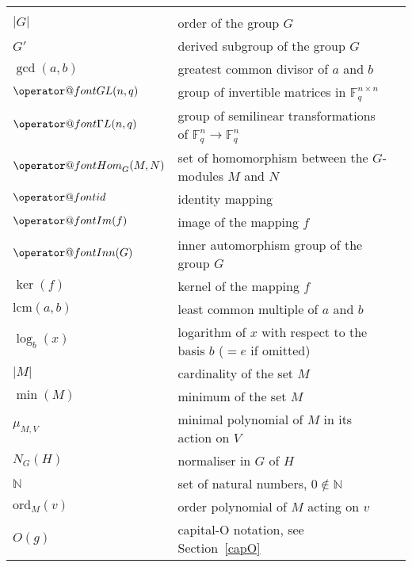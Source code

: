 \documentclass[openany,11pt,british]{book}
\makeatletter
\newcommand{\maop}[1]{%
\ensuremath{\mathop{\operator@font #1}\nolimits}}
\newcommand{\Hom}{\maop{Hom}}
\newcommand{\id}{\maop{id}}
\newcommand{\Ima}{\maop{Im}}
\newcommand{\GL}{\maop{GL}}
\newcommand{\GGL}{\maop{\Gamma L}}
\newcommand{\ord}{\mathrm{ord}}
\newcommand{\lcm}{\mathrm{lcm}}
\newcommand{\Inn}{\maop{Inn}}
\newcommand{\F}{\ensuremath{\mathbb{F}}}
\newcommand{\N}{\ensuremath{\mathbb{N}}}
\theoremstyle{changebreak}
\makeatother
\begin{document}
\begin{longtable}{|lll|}
                        & \\
$|G|$                   & order of the group $G$
                        & \\
$G'$                    & derived subgroup of the group $G$
                        & \\
$\gcd(a,b)$             & greatest common divisor of $a$ and $b$
                        & \\
$\GL(n,q)$              & group of invertible matrices in $\F_q^{n \times n}$
                        & \\
$\GGL(n,q)$             & group of semilinear transformations of 
                          $\F_q^n \to \F_q^n$
                        & \\
$\Hom_G(M,N)$           & set of homomorphism between the $G$-modules $M$
                          and $N$
                        & \\
$\id$                   & identity mapping
                        & \\
$\Ima(f)$               & image of the mapping $f$
                        & \\
$\Inn(G)$               & inner automorphism group of the group $G$
                        & \\
$\ker(f)$               & kernel of the mapping $f$
                        & \\
$\lcm(a,b)$             & least common multiple of $a$ and $b$
                        & \\
$\log_b(x)$             & logarithm of $x$ with respect to the basis $b$
                          ($= e$ if omitted)
                        & \\
$|M|$                   & cardinality of the set $M$
                        & \\
$\min(M)$               & minimum of the set $M$
                        & \\
$\mu_{M,V}$             & minimal polynomial of $M$ in its action on $V$
                        & \\
$N_G(H)$                & normaliser in $G$ of $H$
                        & \\
$\N$                    & set of natural numbers, $0 \notin \N$
                        & \\
$\ord_M(v)$             & order polynomial of $M$ acting on $v$
                        & \\
$O(g)$                  & capital-O notation, see Section~\ref{capO}

\end{longtable}
\end{document}
